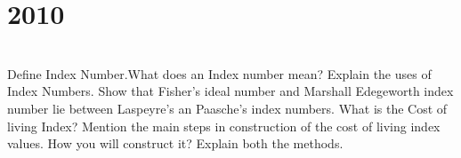 \section*{2010}
\vspace{-.5cm}
\hrulefill \smallskip\\
 Define Index Number.What does an Index number mean? Explain the uses of Index Numbers.
\myline
{} Show that Fisher's ideal number and Marshall Edegeworth index number lie between Laspeyre's an Paasche's index numbers.
\myline
{} What is the Cost of living Index? Mention the main steps in construction of the cost of living index values. How you will construct it? Explain both the methods.
